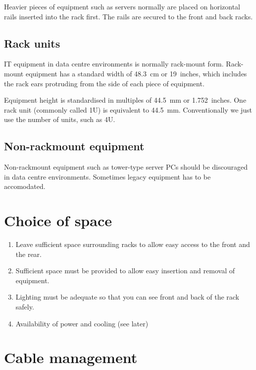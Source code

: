 \documentclass{pgnotes}
\begin{document}
Heavier pieces of equipment such as servers normally are placed on horizontal rails inserted into the rack first.
The rails are secured to the front and back racks.

\subsection{Rack units}

IT equipment in data centre environments is normally rack-mount form.
Rack-mount equipment has a standard width of \SI{48.3}{\centi\metre} or 19~inches, which includes the rack ears protruding from the side of each piece of equipment.

Equipment height is standardised in multiples of \SI{44.5}{\milli\metre} or 1.752~inches.
One rack unit (commonly called 1U) is equivalent to \SI{44.5}{\milli\metre}.
Conventionally we just use the number of units, such as 4U.


\subsection{Non-rackmount equipment}

Non-rackmount equipment such as tower-type server PCs should be discouraged in data centre environments.
Sometimes legacy equipment has to be accomodated.

\section{Choice of space}

\begin{enumerate}

\item Leave sufficient space surrounding racks to allow easy access to the front and the rear.

\item Sufficient space must be provided to allow easy insertion and removal of equipment.

\item Lighting must be adequate so that you can see front and back of the rack safely.

\item Availability of power and cooling (see later)
  
\end{enumerate}

\section{Cable management}
\end{document}
